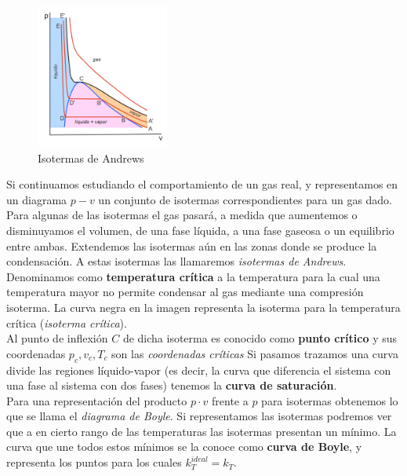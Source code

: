 \documentclass[12pt]{book}
\begin{document}
\begin{figure}[h!]
    \centering
    \includegraphics[width=0.39\textwidth]{isotermas-andrews.png}
    \caption{Isotermas de Andrews}
\end{figure}


Si continuamos estudiando el comportamiento de un gas real, y representamos en  un diagrama $p-v$ un conjunto de isotermas correspondientes para un gas dado. Para algunas de las isotermas el gas pasará, a medida que aumentemos o disminuyamos el volumen, de una fase líquida, a una fase gaseosa o un equilibrio entre ambas. Extendemos las isotermas aún en las zonas donde se produce la condensación. A estas isotermas las llamaremos \textit{isotermas de Andrews}. \\


Denominamos como \textbf{temperatura crítica} a la temperatura para la cual una temperatura mayor no permite condensar al gas mediante una compresión isoterma. La curva negra en la imagen representa la isoterma para la temperatura crítica (\textit{isoterma crítica}).\\


 Al punto de inflexión $C$ de dicha isoterma es conocido como \textbf{punto crítico} y sus coordenadas $p_c,v_c,T_c$ son las \textit{coordenadas críticas} Si pasamos trazamos una curva divide las regiones líquido-vapor (es decir, la curva que diferencia el sistema con una fase al sistema con dos fases) tenemos la \textbf{curva de saturación}. \\

Para una representación del producto $p \cdot v$ frente a $p$ para isotermas obtenemos lo que se llama el \textit{diagrama de Boyle}. Si representamos las isotermas podremos ver que a en cierto rango de las temperaturas las isotermas presentan un mínimo. La curva que une todos estos mínimos se la conoce como \textbf{curva de Boyle}, y representa los puntos para los cuales $k_T^{ideal} = k_T$. \\
 
\end{document}
